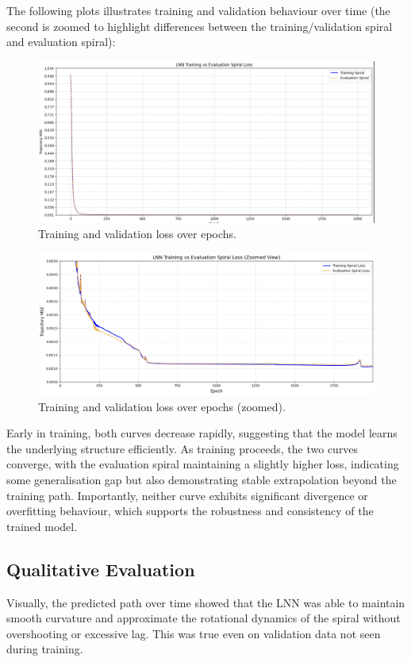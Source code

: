 The following plots illustrates training and validation behaviour over time (the second is zoomed to highlight differences between the training/validation spiral and evaluation spiral):

\begin{figure}[H]
    \centering
    \includegraphics[width=0.8\linewidth]{img/lnn_loss_curve.png}
    \caption{Training and validation loss over epochs.}
    \label{fig:lnn_loss}
\end{figure}

\begin{figure}[H]
    \centering
    \includegraphics[width=0.8\linewidth]{img/lnn_loss_curve_zoomed.png}
    \caption{Training and validation loss over epochs (zoomed).}
    \label{fig:lnn_loss_zoomed}
\end{figure}

Early in training, both curves decrease rapidly, suggesting that the model learns the underlying structure efficiently. As training proceeds, the two curves converge, with the evaluation spiral maintaining a slightly higher loss, indicating some generalisation gap but also demonstrating stable extrapolation beyond the training path. Importantly, neither curve exhibits significant divergence or overfitting behaviour, which supports the robustness and consistency of the trained model.

\subsection*{Qualitative Evaluation}
Visually, the predicted path over time showed that the LNN was able to maintain smooth curvature and approximate the rotational dynamics of the spiral without overshooting or excessive lag. This was true even on validation data not seen during training. 

